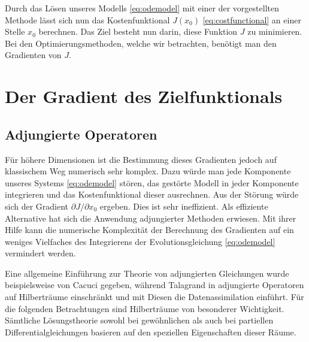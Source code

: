 Durch das Lösen unseres Modells \eqref{eq:odemodel} mit einer der vorgestellten Methode lässt sich nun das Kostenfunktional $J(x_0)$ \eqref{eq:costfunctional} an einer Stelle $x_0$ berechnen. Das Ziel besteht nun darin, diese Funktion $J$ zu minimieren.
Bei den Optimierungsmethoden, welche wir betrachten, benötigt man den Gradienten von $J$.

\section{Der Gradient des Zielfunktionals}
\subsection{Adjungierte Operatoren}
Für höhere Dimensionen ist die Bestimmung dieses Gradienten jedoch auf klassischem Weg numerisch sehr komplex. Dazu würde man jede Komponente unseres Systems \eqref{eq:odemodel} stören, das gestörte Modell in jeder Komponente integrieren und das Kostenfunktional dieser ausrechnen. Aus der Störung würde sich der Gradient $\partial J/\partial x_0$ ergeben. Dies ist sehr ineffizient. Als effiziente Alternative hat sich die Anwendung adjungierter Methoden erwiesen. Mit ihrer Hilfe kann die numerische Komplexität der Berechnung des Gradienten auf ein weniges Vielfaches des Integrierens der Evolutionsgleichung \eqref{eq:odemodel} vermindert werden.

Eine allgemeine Einführung zur Theorie von adjungierten Gleichungen wurde beispielsweise von Cacuci \cite{cacuci1981sensitivity} gegeben, während Talagrand in \cite{talagrand1987variational} adjungierte Operatoren auf Hilberträume einschränkt und mit Diesen die Datenassimilation einführt.
Für die folgenden Betrachtungen sind Hilberträume von besonderer Wichtigkeit. Sämtliche Lösungstheorie sowohl bei gewöhnlichen als auch bei partiellen Differentialgleichungen basieren auf den speziellen Eigenschaften dieser Räume.

